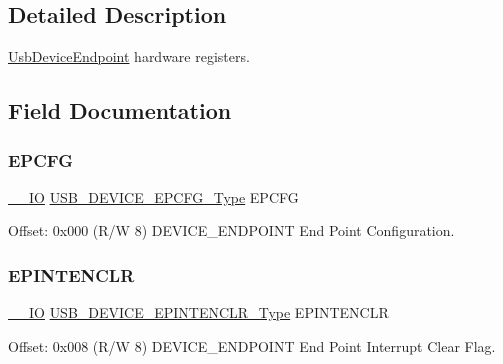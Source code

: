 \subsection{Detailed Description}
\mbox{\hyperlink{struct_usb_device_endpoint}{Usb\+Device\+Endpoint}} hardware registers. 

\subsection{Field Documentation}
\mbox{\label{struct_usb_device_endpoint_aa4114789acba20c3584bf754ce06949e}} 
\subsubsection{\texorpdfstring{EPCFG}{EPCFG}}
{\footnotesize\ttfamily \mbox{\hyperlink{core__cm0plus_8h_aec43007d9998a0a0e01faede4133d6be}{\+\_\+\+\_\+\+IO}} \mbox{\hyperlink{union_u_s_b___d_e_v_i_c_e___e_p_c_f_g___type}{U\+S\+B\+\_\+\+D\+E\+V\+I\+C\+E\+\_\+\+E\+P\+C\+F\+G\+\_\+\+Type}} E\+P\+C\+FG}



Offset\+: 0x000 (R/W 8) D\+E\+V\+I\+C\+E\+\_\+\+E\+N\+D\+P\+O\+I\+NT End Point Configuration. 

\mbox{\label{struct_usb_device_endpoint_a70a309a4cf48aff78691b087172dabe5}} 
\subsubsection{\texorpdfstring{EPINTENCLR}{EPINTENCLR}}
{\footnotesize\ttfamily \mbox{\hyperlink{core__cm0plus_8h_aec43007d9998a0a0e01faede4133d6be}{\+\_\+\+\_\+\+IO}} \mbox{\hyperlink{union_u_s_b___d_e_v_i_c_e___e_p_i_n_t_e_n_c_l_r___type}{U\+S\+B\+\_\+\+D\+E\+V\+I\+C\+E\+\_\+\+E\+P\+I\+N\+T\+E\+N\+C\+L\+R\+\_\+\+Type}} E\+P\+I\+N\+T\+E\+N\+C\+LR}



Offset\+: 0x008 (R/W 8) D\+E\+V\+I\+C\+E\+\_\+\+E\+N\+D\+P\+O\+I\+NT End Point Interrupt Clear Flag. 

\mbox{\label{struct_usb_device_endpoint_a1dd72ffb8a0460966cf950b285f79e75}} 
